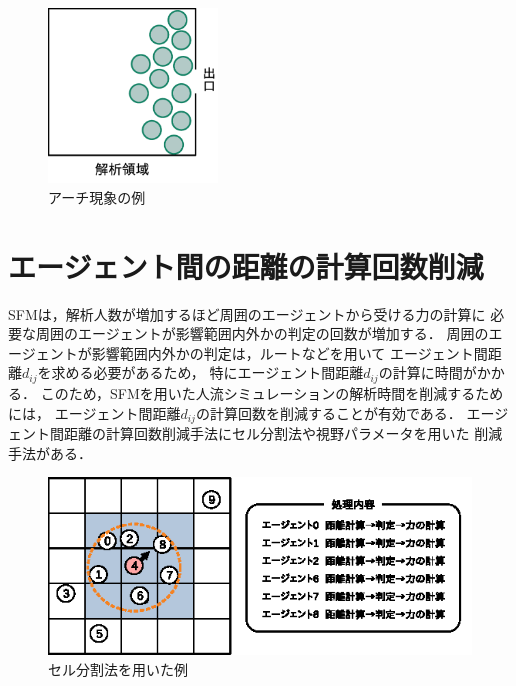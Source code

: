 \begin{figure}[hbtp]
 \begin{center}
  \includegraphics[width=4.5cm,clip]{figure/atigenshou.eps}
  \caption{アーチ現象の例}
  \label{fig:atigenshou}
 \end{center}
\end{figure}

\section{エージェント間の距離の計算回数削減}
SFMは，解析人数が増加するほど周囲のエージェントから受ける力の計算に
必要な周囲のエージェントが影響範囲内外かの判定の回数が増加する．
周囲のエージェントが影響範囲内外かの判定は，ルートなどを用いて
エージェント間距離$d_{ij}$を求める必要があるため，
特にエージェント間距離$d_{ij}$の計算に時間がかかる．
このため，SFMを用いた人流シミュレーションの解析時間を削減するためには，
エージェント間距離$d_{ij}$の計算回数を削減することが有効である．
エージェント間距離の計算回数削減手法にセル分割法や視野パラメータを用いた
削減手法がある．

\begin{figure}[t]
 \begin{center}
  \includegraphics[width=11.5cm,clip]{figure/serubunkatu_ex1.eps}
  \caption{セル分割法を用いた例}
  \label{fig:seru_ex1}
 \end{center}
\end{figure}


